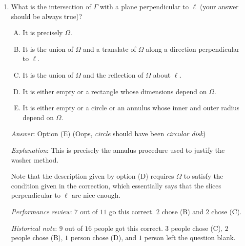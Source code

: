 \documentclass[10pt]{amsart}
\begin{document}
\begin{enumerate}
  {\em Answer}: Option (C).

  {\em Explanation}: The intersection of $\Gamma$ with $\pi$ comprises
  those regions obtained by revolving $\Omega$ that land inside
  $\pi$. This is precisely $\Omega$ and the region obtained by
  revolving $\Omega$ by the {\em angle} $\pi$ (180 degrees;
  unfortunately there's symbol overloading here), which is equivalent
  to the reflection of $\Omega$ about $\ell$.

  {\em Performance review}: $9$ out of $11$ got this correct. $2$
  chose (E).

  {\em Historical note (last year)}: $6$ out of $16$ people got this
  correct. $4$ people chose (A), $3$ people chose (E), $2$ people
  chose (D), and $1$ person chose (B).

\item What is the intersection of $\Gamma$ with a plane
  perpendicular to $\ell$ (your answer should be always true)?

  \begin{enumerate}[(A)]
  \item It is precisely $\Omega$.
  \item It is the union of $\Omega$ and a translate of $\Omega$ along
    a direction perpendicular to $\ell$.
  \item It is the union of $\Omega$ and the reflection of $\Omega$
    about $\ell$.
  \item It is either empty or a rectangle whose dimensions depend on
    $\Omega$.
  \item It is either empty or a circle or an annulus whose inner and
    outer radius depend on $\Omega$.
  \end{enumerate}

  {\em Answer}: Option (E) (Oops, {\em circle} should have been {\em
  circular disk})

  {\em Explanation}: This is precisely the annulus procedure used to
  justify the washer method.

  Note that the description given by option (D) requires $\Omega$ to
  satisfy the condition given in the correction, which essentially
  says that the slices perpendicular to $\ell$ are nice enough. 

  {\em Performance review}: $7$ out of $11$ go this correct. $2$ chose
  (B) and $2$ chose (C).

  {\em Historical note}: $9$ out of $16$ people got this correct. $3$
  people chose (C), $2$ people chose (B), $1$ person chose (D), and
  $1$ person left the question blank.


\end{enumerate}
\end{document}
